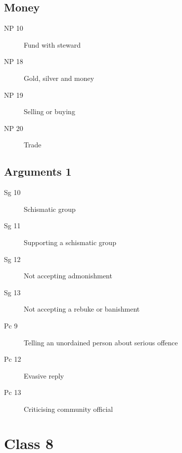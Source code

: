 \documentclass[11pt,oneside]{memoir}
\begin{document}
\begin{multicols}{2}

\section{Money}

\begin{description}
\item[NP 10] Fund with steward
\item[NP 18] Gold, silver and money
\item[NP 19] Selling or buying
\item[NP 20 \orig] Trade%
\end{description}

\columnbreak

\section{Arguments 1}

\begin{description}
\item[Sg 10 \orig] Schismatic group
\item[Sg 11] Supporting a schismatic group
\item[Sg 12] Not accepting admonishment
\item[Sg 13] Not accepting a rebuke or banishment
\item[Pc 9] Telling an unordained person about serious offence
\item[Pc 12] Evasive reply
\item[Pc 13] Criticising community official
\end{description}

\end{multicols}

\chapter{Class 8}
\end{document}
